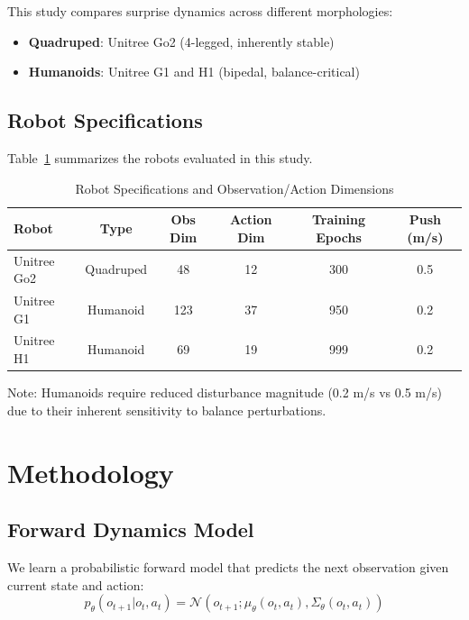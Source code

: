 \documentclass[11pt,a4paper]{article}
\begin{document}
This study compares surprise dynamics across different morphologies:
\begin{itemize}
    \item \textbf{Quadruped}: Unitree Go2 (4-legged, inherently stable)
    \item \textbf{Humanoids}: Unitree G1 and H1 (bipedal, balance-critical)
\end{itemize}

\subsection{Robot Specifications}

Table~\ref{tab:robot_specs} summarizes the robots evaluated in this study.

\begin{table}[H]
    \centering
    \caption{Robot Specifications and Observation/Action Dimensions}
    \label{tab:robot_specs}
    \begin{tabular}{lccccc}
        \toprule
        \textbf{Robot} & \textbf{Type} & \textbf{Obs Dim} & \textbf{Action Dim} & \textbf{Training Epochs} & \textbf{Push (m/s)} \\
        \midrule
        Unitree Go2 & Quadruped & 48 & 12 & 300 & 0.5 \\
        Unitree G1 & Humanoid & 123 & 37 & 950 & 0.2 \\
        Unitree H1 & Humanoid & 69 & 19 & 999 & 0.2 \\
        \bottomrule
    \end{tabular}
\end{table}

Note: Humanoids require reduced disturbance magnitude (0.2 m/s vs 0.5 m/s) due to their inherent sensitivity to balance perturbations.

\section{Methodology}

\subsection{Forward Dynamics Model}

We learn a probabilistic forward model that predicts the next observation given current state and action:
\begin{equation}
    p_\theta(o_{t+1} | o_t, a_t) = \mathcal{N}(o_{t+1}; \mu_\theta(o_t, a_t), \Sigma_\theta(o_t, a_t))
\end{equation}
\end{document}
